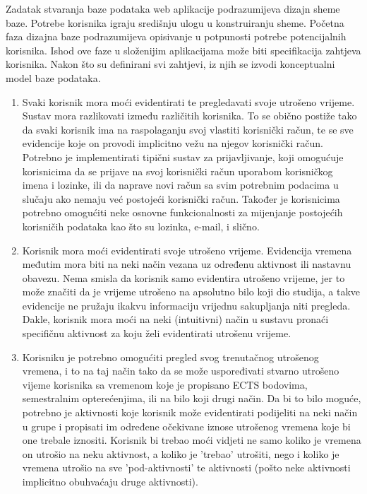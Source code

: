 \documentclass[times, utf8, zavrsni]{fer}
\begin{document}
Zadatak stvaranja baze podataka web aplikacije podrazumijeva dizajn sheme baze. Potrebe korisnika igraju središnju ulogu u konstruiranju sheme. Početna faza dizajna baze podrazumijeva opisivanje u potpunosti potrebe potencijalnih korisnika. Ishod ove faze u složenijim aplikacijama može biti specifikacija zahtjeva korisnika. Nakon što su definirani svi zahtjevi, iz njih se izvodi konceptualni model baze podataka.
\begin{enumerate}[leftmargin=*]
\item Svaki korisnik mora moći evidentirati te pregledavati svoje utrošeno vrijeme. Sustav mora razlikovati između različitih korisnika. To se obično postiže tako da svaki korisnik ima na raspolaganju svoj vlastiti korisnički račun, te se sve evidencije koje on provodi implicitno vežu na njegov korisnički račun. Potrebno je implementirati tipični sustav za prijavljivanje, koji omogućuje korisnicima da se prijave na svoj korisnički račun uporabom korisničkog imena i lozinke, ili da naprave novi račun sa svim potrebnim podacima u slučaju ako nemaju već postojeći korisnički račun. Također je korisnicima potrebno omogućiti neke osnovne funkcionalnosti za mijenjanje postojećih korisničih podataka kao što su lozinka, e-mail, i slično.

\item Korisnik mora moći evidentirati svoje utrošeno vrijeme. Evidencija vremena međutim mora biti na neki način vezana uz određenu aktivnost ili nastavnu obavezu. Nema smisla da korisnik samo evidentira utrošeno vrijeme, jer to može značiti da je vrijeme utrošeno na apsolutno bilo koji dio studija, a takve evidencije ne pružaju ikakvu informaciju vrijednu sakupljanja niti pregleda. Dakle, korisnik mora moći na neki (intuitivni) način u sustavu pronaći specifičnu aktivnost za koju želi evidentirati utrošenu vrijeme.

\item Korisniku je potrebno omogućiti pregled svog trenutačnog utrošenog vremena, i to na taj način tako da se može uspoređivati stvarno utrošeno vijeme korisnika sa vremenom koje je propisano ECTS bodovima, semestralnim opterećenjima, ili na bilo koji drugi način. Da bi to bilo moguće, potrebno je aktivnosti koje korisnik može evidentirati podijeliti na neki način u grupe i propisati im određene očekivane iznose utrošenog vremena koje bi one trebale iznositi. Korisnik bi trebao moći vidjeti ne samo koliko je vremena on utrošio na neku aktivnost, a koliko je 'trebao' utrošiti, nego i koliko je vremena utrošio na sve 'pod-aktivnosti' te aktivnosti (pošto neke aktivnosti implicitno obuhvaćaju druge aktivnosti).
\end{enumerate}
\end{document}
